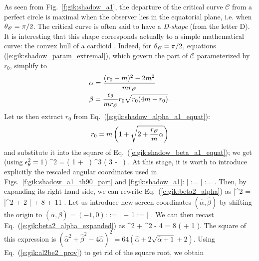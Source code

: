 As seen from Fig.~\ref{f:gik:shadow_a1}, the departure of the critical curve
$\mathscr{C}$ from a perfect circle is maximal when the observer lies in the equatorial
plane, i.e. when $\theta_{\mathscr{O}} = \pi/2$. The critical curve is often said to have
a \emph{D-shape} (from the letter D). It is interesting that this shape
corresponds actually to a simple mathematical curve: the convex hull of a
cardioid \cite{FarahPJB20}.
Indeed, for $\theta_{\mathscr{O}} = \pi/2$, equations (\ref{e:gik:shadow_param_extremal}),
which govern the part of $\mathscr{C}$ parameterized by $r_0$,
simplify to
\begin{subequations}
\label{e:gik:shadow_a1_equat}
\begin{align}
    & \alpha = \frac{(r_0 - m)^2 - 2 m^2}{m r_{\mathscr{O}}} \label{e:gik:shadow_alpha_a1_equat} \\
    & \beta = \frac{\epsilon_\theta}{m r_{\mathscr{O}}} r_0 \sqrt{r_0(4 m - r_0)} . \label{e:gik:shadow_beta_a1_equat}
\end{align}
\end{subequations}
Let us then extract $r_0$ from Eq.~(\ref{e:gik:shadow_alpha_a1_equat}):
\[
    r_0 = m \left( 1 + \sqrt{2 + \frac{r_{\mathscr{O}}}{m}\alpha} \right)
\]
and substitute it into the square of Eq.~(\ref{e:gik:shadow_beta_a1_equat}); we get (using $\epsilon_\theta^2 = 1$)
\be \label{e:gik:beta2_alpha}
    \beta^2 =  \left( 1 + \,  \right) ^3
    \left( 3 -   \, \right) .
\ee
At this stage, it is worth to introduce explicitly the rescaled angular coordinates used
in Figs.~\ref{f:gik:shadow_a1_th90_part} and \ref{f:gik:shadow_a1}:
\be \label{e:gik:def_bar_alp_bet}
    \bar{\alpha} :=  \alpha \qand
    \bar{\beta} :=  \beta .
\ee
Then, by expanding its right-hand side, we can rewrite Eq.~(\ref{e:gik:beta2_alpha}) as
\be \label{e:gik:beta2_alpha_expanded}
    \bar{\beta}^2 = - \bar{\alpha}^2 + 2 \bar{\alpha} + 8  + 11 .
\ee
Let us introduce new screen coordinates $(\hat{\alpha}, \hat{\beta})$ by
shifting the origin to $(\bar{\alpha},\bar{\beta}) = (-1, 0)$:
\be
    \hat{\alpha} := \bar{\alpha} + 1  \qand
    \hat{\beta} := \bar{\beta} .
\ee
We can then recast Eq.~(\ref{e:gik:beta2_alpha_expanded}) as
\be \label{e:gik:al2be2_prov}
    \hat{\alpha}^2 + \hat{\beta}^2 - 4 \hat{\alpha} = 8 \left(  + 1 \right).
\ee
The square of this expression is
$(\hat{\alpha}^2 + \hat{\beta}^2  - 4 \hat{\alpha})^2 =
    64 ( \hat{\alpha} + 2 \sqrt{\hat{\alpha} + 1} + 2 )$.
Using Eq.~(\ref{e:gik:al2be2_prov}) to get rid of the square root, we obtain
